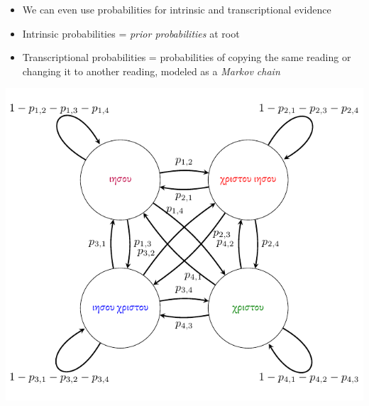 \documentclass[10pt]{beamer}
\begin{document}
	\begin{frame}
		\begin{itemize}
			\item We can even use probabilities for intrinsic and transcriptional evidence
			\item Intrinsic probabilities = \emph{prior probabilities} at root
			\item Transcriptional probabilities = probabilities of copying the same reading or changing it to another reading, modeled as a \emph{Markov chain}
		\end{itemize}
		\begin{center}	
			\includegraphics[scale=0.6667]{../img/markov-chain.pdf}
		\end{center}
	\end{frame}
\end{document}
